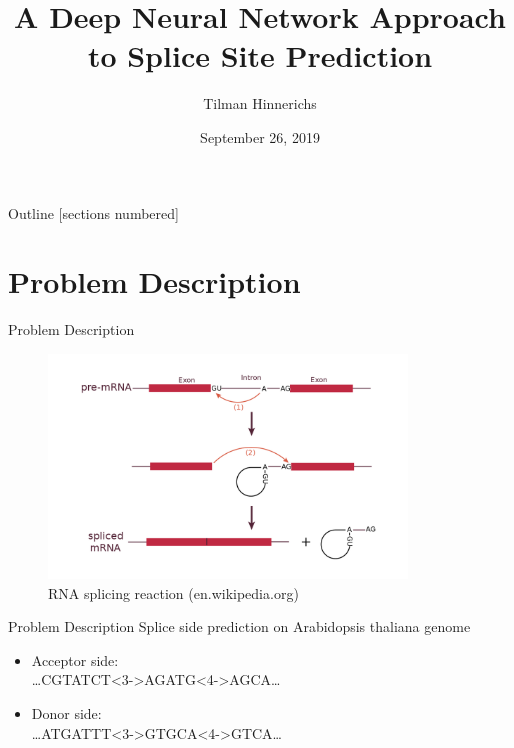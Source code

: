 \documentclass[10pt]{beamer}
\title{A Deep Neural Network Approach to Splice Site Prediction}
\author{Tilman Hinnerichs}
\institute{Knowledge Mining Lab -- KAUST}
\date{September 26, 2019}
\begin{document}
	
\begin{frame}
	\titlepage
\end{frame}

\begin{frame}{Outline}
	[sections numbered]
	\tableofcontents
\end{frame}

\section{Problem Description}
\begin{frame}{Problem Description}
	\begin{figure}[ht]
		\centering
		\includegraphics[width = 0.85\textwidth]{RNA_splicing_reaction.png}
		\caption{RNA splicing reaction (en.wikipedia.org)}
	\end{figure}
\end{frame}

\begin{frame}{Problem Description}
	\large Splice side prediction on Arabidopsis thaliana genome
	\vspace{0.5cm}
	\pause
	\begin{itemize}
		\item Acceptor side:\\
		\dots CGTATCT<3->{AG}ATG<4->{AG}CA\dots
		\item Donor side:\\
		\dots ATGATTT<3->{GT}GCA<4->{GT}CA\dots
		
	\end{itemize}
\end{frame}
\end{document}
